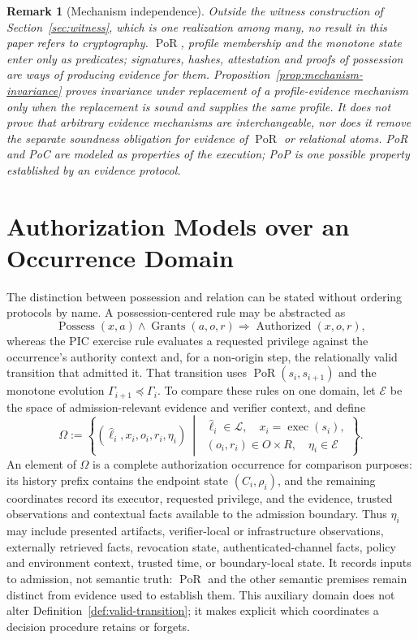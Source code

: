 \documentclass[10pt,twocolumn]{article}
\newcommand{\Lineages}{\mathcal{L}}
\newcommand{\exec}{\operatorname{exec}}
\newcommand{\PoR}{\operatorname{PoR}}
\newtheorem{remark}{Remark}
\begin{document}
\begin{remark}[Mechanism independence]\label{rem:mechanism}
Outside the witness construction of Section~\ref{sec:witness}, which is one
realization among many, no result in this paper refers to cryptography.
\(\PoR\), profile membership and the monotone state enter only as predicates;
signatures, hashes, attestation and proofs of possession are ways of producing
evidence for them. Proposition~\ref{prop:mechanism-invariance} proves invariance
under replacement of a profile-evidence mechanism only when the replacement is
sound and supplies the same profile. It does not prove that arbitrary evidence
mechanisms are interchangeable, nor does it remove the separate soundness
obligation for evidence of \(\PoR\) or relational atoms. PoR and PoC are modeled
as properties of the execution; PoP is one possible property established by an
evidence protocol.
\end{remark}

\section{Authorization Models over an Occurrence Domain}
\label{sec:observation}

The distinction between possession and relation can be stated without ordering
protocols by name. A possession-centered rule may be abstracted as
\[
\operatorname{Possess}(x,a)
\land
\operatorname{Grants}(a,o,r)
\Longrightarrow
\operatorname{Authorized}(x,o,r),
\]
whereas the PIC exercise rule evaluates a requested privilege against the
occurrence's authority context and, for a non-origin step, the relationally
valid transition that admitted it. That transition uses
\(\PoR(s_i,s_{i+1})\) and the monotone evolution
\(\Gamma_{i+1}\preceq\Gamma_i\). To compare these rules on one domain, let
\(\mathcal E\) be the space of admission-relevant evidence and verifier
context, and define
\[
\Omega
:=
\left\{
(\widehat{\ell}_i,x_i,o_i,r_i,\eta_i)
\ \middle|\
\begin{array}{l}
\widehat{\ell}_i\in\Lineages,\quad x_i=\exec(s_i),\\
(o_i,r_i)\in O\times R,\quad \eta_i\in\mathcal E
\end{array}
\right\}.
\]
An element of \(\Omega\) is a complete authorization occurrence for comparison
purposes: its history prefix contains the endpoint state \((C_i,\rho_i)\), and
the remaining coordinates record its executor, requested privilege, and the
evidence, trusted observations and contextual facts available to the admission
boundary. Thus \(\eta_i\) may include presented artifacts, verifier-local or
infrastructure observations, externally retrieved facts, revocation state,
authenticated-channel facts, policy and environment context, trusted time, or
boundary-local state. It records inputs to admission, not semantic truth:
\(\PoR\) and the other semantic premises remain distinct from evidence used to
establish them. This auxiliary domain does not alter
Definition~\ref{def:valid-transition}; it makes explicit which coordinates a
decision procedure retains or forgets.
\end{document}
